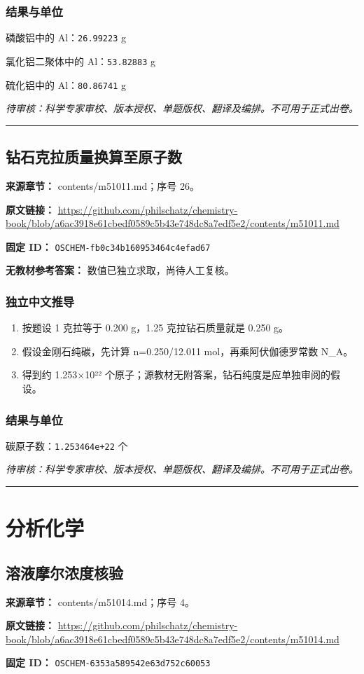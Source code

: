 \documentclass[UTF8,11pt,oneside,openany,fontset=none]{ctexbook}
\begin{document}
\subsection*{结果与单位}
\noindent 磷酸铝中的 Al：\texttt{26.99223} g\par
\noindent 氯化铝二聚体中的 Al：\texttt{53.82883} g\par
\noindent 硫化铝中的 Al：\texttt{80.86741} g\par
\noindent\textit{待审核：科学专家审校、版本授权、单题版权、翻译及编排。不可用于正式出卷。}
\medskip\hrule\medskip
\section{钻石克拉质量换算至原子数}
\noindent\textbf{来源章节：} contents/m51011.md；序号 26。\par
\noindent\textbf{原文链接：} \url{https://github.com/philschatz/chemistry-book/blob/a6ac3918e61cbedf0589c5b43e748dc8a7edf5e2/contents/m51011.md}\par
\noindent\textbf{固定 ID：} \texttt{OSCHEM-fb0c34b160953464c4efad67}\par
\textbf{无教材参考答案：} 数值已独立求取，尚待人工复核。\par
\subsection*{独立中文推导}
\begin{enumerate}
\item 按题设 1 克拉等于 0.200 g，1.25 克拉钻石质量就是 0.250 g。
\item 假设金刚石纯碳，先计算 n=0.250/12.011 mol，再乘阿伏伽德罗常数 N\_A。
\item 得到约 1.253×10²² 个原子；源教材无附答案，钻石纯度是应单独审阅的假设。
\end{enumerate}
\subsection*{结果与单位}
\noindent 碳原子数：\texttt{1.253464e+22} 个\par
\noindent\textit{待审核：科学专家审校、版本授权、单题版权、翻译及编排。不可用于正式出卷。}
\medskip\hrule\medskip
\chapter{分析化学}
\section{溶液摩尔浓度核验}
\noindent\textbf{来源章节：} contents/m51014.md；序号 4。\par
\noindent\textbf{原文链接：} \url{https://github.com/philschatz/chemistry-book/blob/a6ac3918e61cbedf0589c5b43e748dc8a7edf5e2/contents/m51014.md}\par
\noindent\textbf{固定 ID：} \texttt{OSCHEM-6353a589542e63d752c60053}\par
\end{document}
